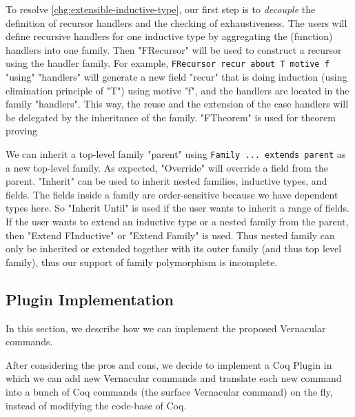 To resolve \ref{chg:extensible-inductive-type}, our first step is to \textit{decouple} the definition of recursor handlers and the checking of exhaustiveness. The users will define recursive handlers for one inductive type by aggregating the (function) handlers into one family. Then
"FRecursor" will be used to construct a recursor using the handler family.
For example, \texttt{FRecursor recur about T motive f} "using"
"handlers" will generate a new field "recur" that is doing induction
(using elimination principle of "T") using motive "f", and the handlers
are located in the family "handlers". This way, the reuse and the extension of the case handlers will be delegated by the inheritance of the family. "FTheorem" is used for theorem proving


We can inherit a top-level family "parent" using \texttt{Family
... extends parent} as a new top-level family. As expected, "Override"
will override a field from the parent. "Inherit" can be used to inherit
nested families, inductive types, and fields. The fields inside a family
are order-sensitive because we have dependent types here. So "Inherit
Until" is used if the user wants to inherit a range of fields. If the
user wants to extend an inductive type or a nested family from the
parent, then "Extend FInductive" or "Extend Family" is used. Thus nested
family can only be inherited or extended together with its outer family
(and thus top level family), thus our support of family polymorphism is
incomplete.


\subsection{Plugin Implementation}

In this section, we describe how we can implement the proposed Vernacular commands.

After considering the pros and cons, we decide to implement a Coq Plugin in which we can add new Vernacular commands and translate each new command into a bunch of Coq commands (the surface Vernacular command) on the fly, instead of modifying the code-base of Coq. 

